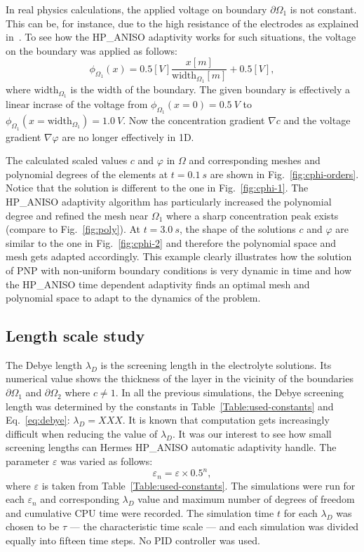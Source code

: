 In real physics calculations, the applied voltage on boundary $\partial\Omega_1$
is not constant. This can be, for instance, due to the high resistance of
the electrodes as explained in~\cite{pugal2009}.
To see how the HP\_ANISO adaptivity works for such situations, the
voltage on the boundary was applied as follows:
\begin{equation}
  \phi_{\Omega_1}\left( x \right)=0.5\left[V \right] \frac{x\left[ m \right ]}{\text{width}_{\Omega_1}\left[ m \right]}+0.5\left[ V \right],
\end{equation}
where $\text{width}_{\Omega_1}$ is the width of the boundary. The given boundary is effectively
a linear incrase of the voltage from $\phi_{\Omega_1}\left(x = 0 \right)=0.5\ V$ to
$\phi_{\Omega_1}\left(x=\text{width}_{\Omega_1}\right) = 1.0\ V$.
Now the concentration gradient $\nabla c$ and the voltage gradient $\nabla \varphi$ are no
longer effectively in 1D.

The calculated scaled values $c$ and $\varphi$ in $\Omega$ and corresponding meshes and polynomial
degrees of the elements at $t=0.1\ s$ are shown in Fig.~\ref{fig:cphi-orders}.
Notice that the solution
is different to the one in Fig.~\ref{fig:cphi-1}. The HP\_ANISO
adaptivity algorithm has particularly increased the polynomial degree
and refined the mesh near $\Omega_1$ where a sharp concentration
peak exists (compare to Fig.~\ref{fig:poly}).
At $t=3.0\ s$, the shape of the solutions $c$ and $\varphi$ are similar to the one
in Fig.~\ref{fig:cphi-2} and therefore the polynomial space and mesh gets adapted
accordingly. This example clearly illustrates how 
the solution of PNP with non-uniform
boundary conditions is very dynamic in time
and how the HP\_ANISO time dependent adaptivity 
finds an optimal mesh and polynomial space to adapt to the dynamics
of the problem. 

\subsection{Length scale study}

The Debye length $\lambda_D$ is the screening length in the electrolyte
solutions. Its numerical value shows the
thickness of the layer in the vicinity of the boundaries $\partial\Omega_1$ 
and $\partial\Omega_2$  where $c \neq 1$.
In all the previous simulations, the Debye screening length was determined by  the constants in
Table~\ref{Table:used-constants} and Eq.~\ref{eq:debye}: $\lambda_D=XXX$. It is known that computation gets increasingly
difficult when reducing the value of $\lambda_D$.
It was our interest to see how small screening lengths can Hermes HP\_ANISO automatic
adaptivity handle. The parameter $\varepsilon$ was varied as follows:
$$\varepsilon_n=\varepsilon\times 0.5^n,$$ where $\varepsilon$ is taken from Table~\ref{Table:used-constants}. The simulations were run for each $\varepsilon_n$ and corresponding $\lambda_D$ value
and maximum number of degrees of freedom and cumulative CPU time were recorded.
The simulation time $t$ for each $\lambda_D$ was chosen to be $\tau$ --- the
characteristic time scale --- and each simulation
was divided equally into fifteen time steps. No PID controller was used.